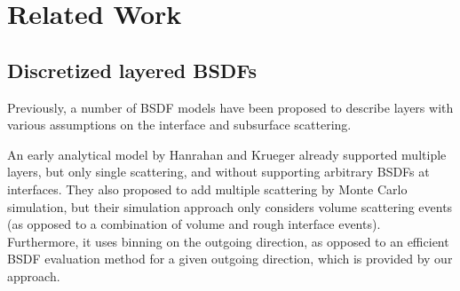 \section{Related Work}
\label{sec:layeredbsdf:related}



\subsection{Discretized layered BSDFs}
Previously, a number of BSDF models have been proposed to describe layers with various assumptions on the interface and subsurface scattering.

An early analytical model by Hanrahan and Krueger \cite{hanrahan1993reflection} already supported multiple layers, but only single scattering, and without supporting arbitrary BSDFs at interfaces. They also proposed to add multiple scattering by Monte Carlo simulation, but their simulation approach only considers volume scattering events (as opposed to a combination of volume and rough interface events). Furthermore, it uses binning on the outgoing direction, as opposed to an efficient BSDF evaluation method for a given outgoing direction, which is provided by our approach.
%
%
